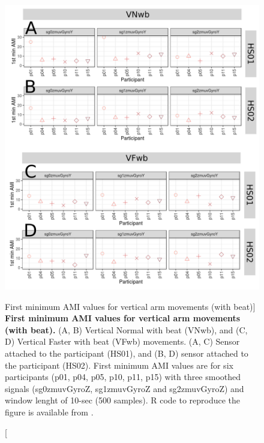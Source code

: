\begin{figure}
\centering
\includegraphics[width=1.0\textwidth]{ami_Vwb_w10}
	\caption
	[First minimum AMI values for vertical arm movements (with beat)]{
	{\bf First minimum AMI values for vertical arm movements (with beat).}
		(A, B) Vertical Normal with beat (VNwb), and 
		(C, D) Vertical Faster with beat (VFwb) movements.
		(A, C) Sensor attached to the participant (HS01), and
		(B, D) sensor attached to the participant (HS02).
		First minimum AMI values are for six participants 
		(p01, p04, p05, p10, p11, p15) with three smoothed 
		signals (sg0zmuvGyroZ, sg1zmuvGyroZ and sg2zmuvGyroZ) and 
		window lenght of 10-sec (500 samples).
		R code to reproduce the figure is available 
		from \cite{xochicale2018}.
        }
    \label{fig:amiVwb}
\end{figure}












